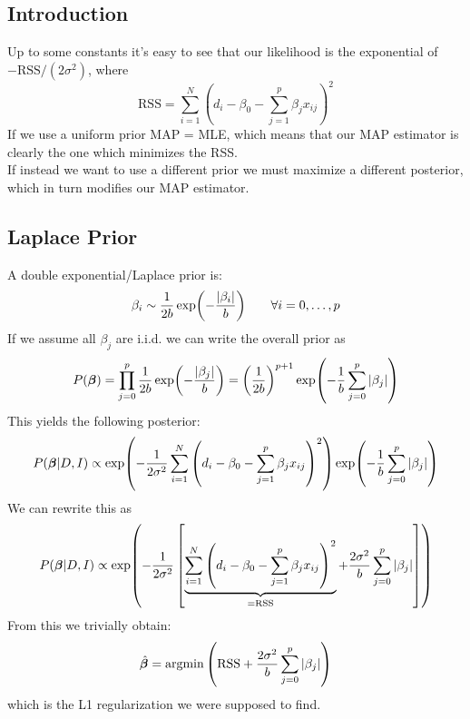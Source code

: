\documentclass[a4paper]{article}
\newcommand{\tonde}[1]{\left( {#1} \right)}
\newcommand{\quadre}[1]{\left[ {#1} \right]}
\begin{document}
\subsection{Introduction}
Up to some constants it's easy to see that our likelihood is the exponential of $-\text{RSS}/(2\sigma^2)$, where
\begin{equation*}
    \text{RSS} = \sum_{i=1}^N \tonde{d_i - \beta_0 -\sum_{j=1}^p \beta_j x_{ij}}^2
\end{equation*}
If we use a uniform prior MAP = MLE, which means that our MAP estimator is clearly the one which minimizes the RSS.\\
If instead we want to use a different prior we must maximize a different posterior, which in turn modifies our MAP estimator.
\subsection{Laplace Prior}
A double exponential/Laplace prior is:
\begin{equation*}
    \beta_i \sim \frac{1}{2b}\exp(-\frac{\abs{\beta_i}}{b}) \qquad \forall i = 0,\dots, p
\end{equation*}
If we assume all $\beta_j$ are i.i.d. we can write the overall prior as
\begin{equation*}
    P(\vb*{\beta}) = \prod_{j=0}^p \frac{1}{2b}\exp(-\frac{\abs{\beta_j}}{b}) = \tonde{\frac{1}{2b}}^{p+1}\exp(-\frac{1}{b}\sum_{j=0}^p \abs{\beta_j})
\end{equation*}
This yields the following posterior:
\begin{equation*}
    P(\vb*{\beta}|D,I) \propto \exp(-\frac{1}{2\sigma^2}\sum_{i=1}^N \tonde{d_i - \beta_0 -\sum_{j=1}^p \beta_j x_{ij}}^2)\exp(-\frac{1}{b}\sum_{j=0}^p \abs{\beta_j})
\end{equation*}
We can rewrite this as 
\begin{equation*}
    P(\vb*{\beta}|D,I) \propto \exp(-\frac{1}{2\sigma^2}\quadre{\underbrace{\sum_{i=1}^N \tonde{d_i - \beta_0 -\sum_{j=1}^p \beta_j x_{ij}}^2}_{= \text{RSS}} + \frac{2\sigma^2}{b}\sum_{j=0}^p \abs{\beta_j}})
\end{equation*}
From this we trivially obtain:
\begin{equation*}
    \hat{\vb*{\beta}} = \text{argmin} \tonde{\text{RSS} + \frac{2\sigma^2}{b}\sum_{j=0}^p \abs{\beta_j}}
\end{equation*}
which is the L1 regularization we were supposed to find.
\end{document}
